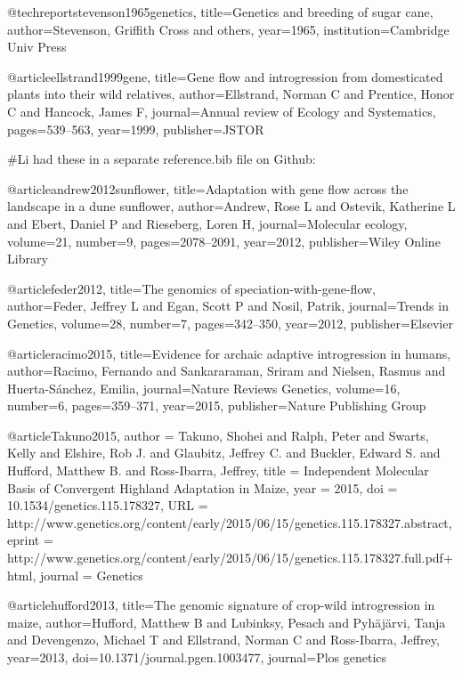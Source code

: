 @techreport{stevenson1965genetics,
  title={Genetics and breeding of sugar cane},
  author={Stevenson, Griffith Cross and others},
  year={1965},
  institution={Cambridge Univ Press}
}

@article{ellstrand1999gene,
  title={Gene flow and introgression from domesticated plants into their wild relatives},
  author={Ellstrand, Norman C and Prentice, Honor C and Hancock, James F},
  journal={Annual review of Ecology and Systematics},
  pages={539--563},
  year={1999},
  publisher={JSTOR}
}

#Li had these in a separate reference.bib file on Github:

@article{andrew2012sunflower,
  title={Adaptation with gene flow across the landscape in a dune sunflower},
  author={Andrew, Rose L and Ostevik, Katherine L and Ebert, Daniel P and Rieseberg, Loren H},
  journal={Molecular ecology},
  volume={21},
  number={9},
  pages={2078--2091},
  year={2012},
  publisher={Wiley Online Library}
}

@article{feder2012,
  title={The genomics of speciation-with-gene-flow},
  author={Feder, Jeffrey L and Egan, Scott P and Nosil, Patrik},
  journal={Trends in Genetics},
  volume={28},
  number={7},
  pages={342--350},
  year={2012},
  publisher={Elsevier}
}


@article{racimo2015,
  title={Evidence for archaic adaptive introgression in humans},
  author={Racimo, Fernando and Sankararaman, Sriram and Nielsen, Rasmus and Huerta-S{\'a}nchez, Emilia},
  journal={Nature Reviews Genetics},
  volume={16},
  number={6},
  pages={359--371},
  year={2015},
  publisher={Nature Publishing Group}
}

@article{Takuno2015,
author = {Takuno, Shohei and Ralph, Peter and Swarts, Kelly and Elshire, Rob J. and Glaubitz, Jeffrey C. and Buckler, Edward S. and Hufford, Matthew B. and Ross-Ibarra, Jeffrey}, 
title = {Independent Molecular Basis of Convergent Highland Adaptation in Maize},
year = {2015}, 
doi = {10.1534/genetics.115.178327}, 
URL = {http://www.genetics.org/content/early/2015/06/15/genetics.115.178327.abstract}, 
eprint = {http://www.genetics.org/content/early/2015/06/15/genetics.115.178327.full.pdf+html}, 
journal = {Genetics} 
}

@article{hufford2013,
  title={The genomic signature of crop-wild introgression in maize},
  author={Hufford, Matthew B and Lubinksy, Pesach and Pyh{\"a}j{\"a}rvi, Tanja and Devengenzo, Michael T and Ellstrand, Norman C and Ross-Ibarra, Jeffrey},
  year={2013},
  doi={10.1371/journal.pgen.1003477},
  journal={Plos genetics} 
}

